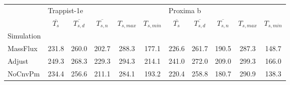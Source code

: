 \begin{tabular}{lcccccccccc}
\toprule
{} & \multicolumn{5}{l}{Trappist-1e} & \multicolumn{5}{l}{Proxima b} \\
{} & $\overline{T_s}$ & $\overline{T_{s,d}}$ & $\overline{T_{s,n}}$ & $T_{s,max}$ & $T_{s,min}$ & $\overline{T_s}$ & $\overline{T_{s,d}}$ & $\overline{T_{s,n}}$ & $T_{s,max}$ & $T_{s,min}$ \\
Simulation &                  &                      &                      &             &             &                  &                      &                      &             &             \\
\midrule
MassFlux   &            231.8 &                260.0 &                202.7 &       288.3 &       177.1 &            226.6 &                261.7 &                190.5 &       287.3 &       148.7 \\
Adjust     &            249.3 &                268.3 &                229.3 &       294.3 &       214.1 &            241.0 &                272.0 &                209.0 &       299.3 &       166.0 \\
NoCnvPm    &            234.4 &                256.6 &                211.1 &       284.1 &       193.2 &            220.4 &                258.8 &                180.7 &       290.9 &       138.3 \\
\bottomrule
\end{tabular}
